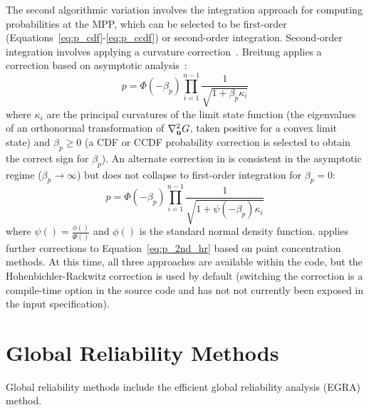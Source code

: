 The second algorithmic variation involves the integration approach for
computing probabilities at the MPP, which can be selected to be
first-order (Equations~\ref{eq:p_cdf}-\ref{eq:p_ccdf}) or second-order
integration.  Second-order integration involves applying a curvature
correction~\cite{Bre84,Hoh88,Hon99}.  Breitung applies a correction
based on asymptotic analysis~\cite{Bre84}:
\begin{equation}
p = \Phi(-\beta_p) \prod_{i=1}^{n-1} \frac{1}{\sqrt{1 + \beta_p \kappa_i}}
\label{eq:p_2nd_breit}
\end{equation}
where $\kappa_i$ are the principal curvatures of the limit state
function (the eigenvalues of an orthonormal transformation of
$\nabla^2_{\bf u} G$, taken positive for a convex limit state) and
$\beta_p \ge 0$ (a CDF or CCDF probability correction is selected to
obtain the correct sign for $\beta_p$).  An alternate correction in
\cite{Hoh88} is consistent in the asymptotic regime ($\beta_p \to \infty$) 
but does not collapse to first-order integration for $\beta_p = 0$:
\begin{equation}
p = \Phi(-\beta_p) \prod_{i=1}^{n-1} 
\frac{1}{\sqrt{1 + \psi(-\beta_p) \kappa_i}} \label{eq:p_2nd_hr}
\end{equation}
where $\psi() = \frac{\phi()}{\Phi()}$ and $\phi()$ is the standard
normal density function.  \cite{Hon99} applies further corrections to
Equation~\ref{eq:p_2nd_hr} based on point concentration methods.  At
this time, all three approaches are available within the code, but the
Hohenbichler-Rackwitz correction is used by default (switching the 
correction is a compile-time option in the source code and has not
not currently been exposed in the input specification).


\section{Global Reliability Methods}\label{uq:reliability:global}

Global reliability methods include the efficient global reliability
analysis (EGRA) method.

